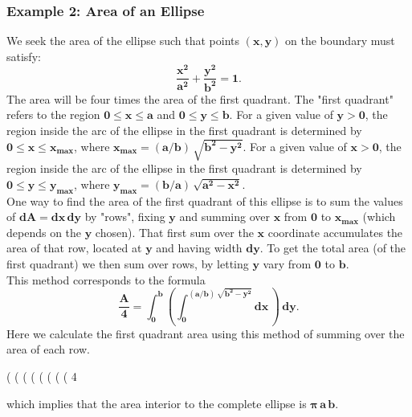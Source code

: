 \documentclass[12pt]{article}
\begin{document}
\subsubsection*{Example 2: Area of an Ellipse}
We seek the area of the ellipse such that points $\mathbf{(x,y)}$ on the boundary must satisfy:
\begin{equation}
\mathbf{\frac{x^2}{a^2} + \frac{y^2}{b^2} = 1}.
\end{equation}
The area will be four times the area of the first quadrant.
The "first quadrant" refers to the region $\mathbf{0 \leq x \leq a}$ and
  $\mathbf{0 \leq y \leq b}$.
For a given value of $\mathbf{y > 0}$, the region inside the arc of the ellipse in the
  first quadrant is determined by $\mathbf{0 \leq x \leq x_{max}}$, where
   $\mathbf{x_{max} = (a/b)\, \sqrt{b^2 - y^2}}$.
For a given value of $\mathbf{x > 0}$, the region inside the arc of the ellipse in the
  first quadrant is determined by $\mathbf{0 \leq y \leq y_{max}}$, where  
  $\mathbf{y_{max} = (b/a)\, \sqrt{a^2 - x^2}}$.\\

\noindent One way to find the area of the first quadrant of this ellipse is to sum the values
  of $\mathbf{dA = dx\,dy}$ by "rows", fixing $\mathbf{y}$ and summing over $\mathbf{x}$
  from $\mathbf{0}$ to $\mathbf{x_{max}}$ (which depends on the $\mathbf{y}$ chosen). 
That first sum over the $\mathbf{x}$ coordinate accumulates the area of that row, located at $\mathbf{y}$
  and having width $\mathbf{dy}$.
To get the total area (of the first quadrant) we then sum over rows, by letting
  $\mathbf{y}$ vary from $\mathbf{0}$ to $\mathbf{b}$.\\
This method corresponds to the formula
\begin{equation}
\mathbf{\frac{A}{4} = \int_{0}^{b}  \left( \int_{0}^{ (a/b)\,\sqrt{b^2 - y^2} } dx \, \right) \,dy }.
\end{equation}
Here we calculate the first quadrant area using this
   method of summing over the area of each row.
\begin{myVerbatim}
(%
(%
(%
(%
(%
(%
(%
(%
                                       4
\end{myVerbatim} 
which implies that the area interior to the complete ellipse is $\mathbf{\boldsymbol{\pi}\,a\,b}$.\\
\end{document}
